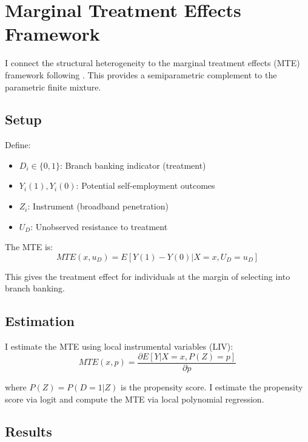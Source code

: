 \documentclass[12pt]{article}
\begin{document}
\section{Marginal Treatment Effects Framework}
\label{app:mte}

I connect the structural heterogeneity to the marginal treatment effects (MTE) framework following \citet{heckman2005}. This provides a semiparametric complement to the parametric finite mixture.

\subsection{Setup}

Define:
\begin{itemize}
    \item $D_i \in \{0,1\}$: Branch banking indicator (treatment)
    \item $Y_i(1), Y_i(0)$: Potential self-employment outcomes
    \item $Z_i$: Instrument (broadband penetration)
    \item $U_D$: Unobserved resistance to treatment
\end{itemize}

The MTE is:
\begin{equation}
MTE(x, u_D) = E[Y(1) - Y(0) | X = x, U_D = u_D]
\end{equation}

This gives the treatment effect for individuals at the margin of selecting into branch banking.

\subsection{Estimation}

I estimate the MTE using local instrumental variables (LIV):
\begin{equation}
MTE(x, p) = \frac{\partial E[Y | X = x, P(Z) = p]}{\partial p}
\end{equation}

where $P(Z) = P(D = 1 | Z)$ is the propensity score. I estimate the propensity score via logit and compute the MTE via local polynomial regression.

\subsection{Results}
\end{document}
